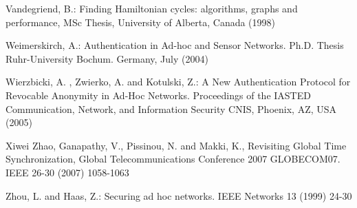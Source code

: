 \documentclass{article}
\begin{document}
\begin{thebibliography}{10}
 Vandegriend, B.: Finding Hamiltonian cycles: algorithms, graphs and performance, MSc Thesis, University of Alberta, Canada (1998)

 Weimerskirch, A.: Authentication in Ad-hoc and
Sensor Networks. Ph.D. Thesis Ruhr-University Bochum. Germany,
July (2004)

 Wierzbicki, A. ,  Zwierko, A. and Kotulski, Z.: A New Authentication Protocol for Revocable Anonymity in Ad-Hoc
Networks. Proceedings of the IASTED Communication, Network, and
Information Security CNIS, Phoenix, AZ, USA (2005)

  Xiwei Zhao, Ganapathy, V., Pissinou, N. and Makki, K., Revisiting Global Time Synchronization, Global Telecommunications Conference 2007 GLOBECOM07. IEEE 26-30 (2007) 1058-1063

Zhou, L. and Haas, Z.: Securing ad hoc networks. IEEE Networks 13
(1999)  24-30


\end{thebibliography}
\end{document}

